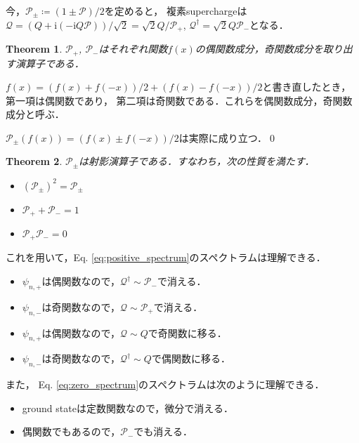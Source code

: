 \documentclass[english, dvipdfmx, a4paper]{jsarticle}
\theoremstyle{break}
\newtheorem{thm}{Theorem}[section]
\renewcommand{\i}{\mathrm{i}}
\newcommand{\Q}{\mathcal{Q}}
\renewcommand{\P}{\mathcal{P}}
\begin{document}
	今，$\P_{\pm}\coloneqq (1 \pm \P)/2$を定めると，
	複素superchargeは$\Q = (Q + \i(-\i Q \mathcal{P}))/\sqrt{2}=\sqrt{2}Q/\P_+$, $\Q^{\dag} = \sqrt{2}Q\P_-$となる．
	
	\begin{thm}
		$\P_{+}$, $\P_{-}$はそれぞれ関数$f(x)$の偶関数成分，奇関数成分を取り出す演算子である．
	\end{thm}
	$f(x) = (f(x) + f(-x))/2 + (f(x) - f(-x))/2$と書き直したとき，第一項は偶関数であり，
	第二項は奇関数である．これらを偶関数成分，奇関数成分と呼ぶ．

	$\P_{\pm}(f(x)) = (f(x) \pm f(-x))/2$は実際に成り立つ．\qed
	\begin{thm}
		$\P_{\pm}$は射影演算子である．すなわち，次の性質を満たす．
		\begin{itemize}
			\item $(\P_{\pm})^2 = \P_{\pm}$
			\item $\P_+ + \P_- = 1$
			\item $\P_+\P_- = 0$
		\end{itemize}
	\end{thm}

	これを用いて，Eq. \eqref{eq:positive_spectrum}のスペクトラムは理解できる．
	\begin{itemize}
		\item $\psi_{n, +}$は偶関数なので，$\Q^{\dag}\sim\P_-$で消える．
		\item $\psi_{n, -}$は奇関数なので，$\Q\sim\P_+$で消える．
		\item $\psi_{n, +}$は偶関数なので，$\Q\sim Q$で奇関数に移る．
		\item $\psi_{n, -}$は奇関数なので，$\Q^{\dag}\sim Q$で偶関数に移る．
	\end{itemize}

	また， Eq. \eqref{eq:zero_spectrum}のスペクトラムは次のように理解できる．
	\begin{itemize}
		\item ground stateは定数関数なので，微分で消える．
		\item 偶関数でもあるので，$\P_-$でも消える．
	\end{itemize}
\end{document}
